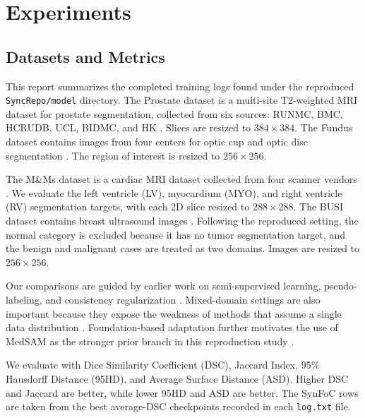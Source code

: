 \section{Experiments}
\subsection{Datasets and Metrics}
This report summarizes the completed training logs found under the reproduced \texttt{SyncRepo/model} directory. The Prostate dataset is a multi-site T2-weighted MRI dataset for prostate segmentation, collected from six sources: RUNMC, BMC, HCRUDB, UCL, BIDMC, and HK \cite{liu2020shape}. Slices are resized to $384\times384$. The Fundus dataset contains images from four centers for optic cup and optic disc segmentation \cite{wang2020dofe}. The region of interest is resized to $256\times256$.

The M\&Ms dataset is a cardiac MRI dataset collected from four scanner vendors \cite{campello2021multi}. We evaluate the left ventricle (LV), myocardium (MYO), and right ventricle (RV) segmentation targets, with each 2D slice resized to $288\times288$. The BUSI dataset contains breast ultrasound images \cite{al2020dataset}. Following the reproduced setting, the normal category is excluded because it has no tumor segmentation target, and the benign and malignant cases are treated as two domains. Images are resized to $256\times256$.

Our comparisons are guided by earlier work on semi-supervised learning, pseudo-labeling, and consistency regularization \cite{tarvainen2017mean,lee2013pseudo,sohn2020fixmatch,chen2021semi}. Mixed-domain settings are also important because they expose the weakness of methods that assume a single data distribution \cite{ma2024constructing}. Foundation-based adaptation further motivates the use of MedSAM as the stronger prior branch in this reproduction study \cite{kirillov2023segment,ma2024segment}.

We evaluate with Dice Similarity Coefficient (DSC), Jaccard Index, 95\% Hausdorff Distance (95HD), and Average Surface Distance (ASD). Higher DSC and Jaccard are better, while lower 95HD and ASD are better. The SynFoC rows are taken from the best average-DSC checkpoints recorded in each \texttt{log.txt} file.

